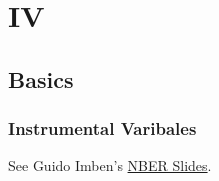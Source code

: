 \section{IV}
\subsection{Basics}

\begin{frame}
\frametitle{Instrumental Varibales}

See Guido Imben's \href{https://www.nber.org/WNE/slides_5_late7-30-07.pdf}{NBER Slides}.

\end{frame}

